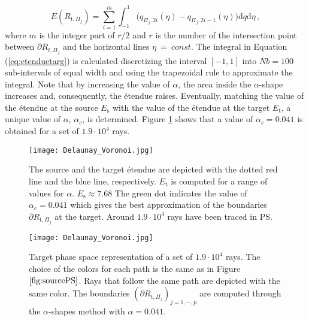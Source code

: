 \begin{equation}\label{eq:etenduetarg}
 E(R_{\textrm{t}, \Pi_j}) =\sum_{i = 1}^{m} \int_{-1}^{1}{(q_{\Pi_j, 2i}( \eta)}-{q_{\Pi_j,2i-1} ( \eta) )} \textrm{d}q\textrm{d}\eta \,,
\end{equation}
where $m$ is the integer part of $r/2$ and $r$ is the number of the intersection point between $\partial R_{t,\Pi_j}$
and the horizontal lines $\eta ~=~ const$. The integral in Equation (\ref{eq:etenduetarg}) is calculated discretizing the interval $[-1, 1]$
   into $Nb=100$ sub-intervals of equal width and using the trapezoidal rule to approximate the integral.
   Note that by increasing the value of $\alpha$, the area inside the $\alpha$-shape increases and, consequently, the \'{e}tendue raises.
\noindent Eventually, matching the value of the \'{e}tendue at the source $E_{\textrm{s}}$ with the value of the \'{e}tendue at the target $E_{\textrm{t}}$, a unique value of $\alpha$, $\alpha_{c}$, is determined.
 Figure \ref{fig:etendueTS} shows that a value of $\alpha_c = 0.041$ is obtained for a set of $1.9\cdot 10^4$ rays.
 \begin{figure}[h]
  \begin{center}
  \texttt{[image: Delaunay\_Voronoi.jpg]}
  \end{center}
  \caption{\footnotesize{The source and the target \'{e}tendue are depicted with the dotted red line and the blue line, respectively.
  $E_\textrm{t}$ is computed for a range of values for $\alpha$. $E_{\textrm{s}} \approx 7.68$
   The green dot indicates the value of $\alpha_c = 0.041$ which gives the best approximation of the boundaries $\partial R_{\textrm{t}, \Pi_j}$ at the target.
   Around $1.9 \cdot 10^4$ rays have been traced in PS.
  }}
  \label{fig:etendueTS}
\end{figure}
  \begin{figure}[h]
  \begin{center}
  \texttt{[image: Delaunay\_Voronoi.jpg]}
  \end{center}
  \caption{\footnotesize{Target phase space representation of a set of $1.9 \cdot 10^4$ rays.
  The choice of the colors for each path is the same as in Figure $\ref{fig:sourcePS}$.
  Rays that follow the same path are depicted with the same color. The boundaries $(\partial R_{\textrm{t}, \Pi_j})_{j = 1, \cdots, p}$ are computed through the $\alpha$-shapes method with $\alpha = 0.041$.}}
  \label{fig:targetPS}
\end{figure}

